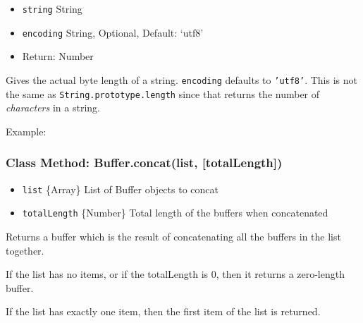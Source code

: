 \begin{itemize}
\itemsep1pt\parskip0pt
\item
  \texttt{string} String
\item
  \texttt{encoding} String, Optional, Default: `utf8'
\item
  Return: Number
\end{itemize}

Gives the actual byte length of a string. \texttt{encoding} defaults to
\texttt{'utf8'}. This is not the same as
\texttt{String.prototype.length} since that returns the number of
\emph{characters} in a string.

Example:

\begin{Shaded}
\begin{Highlighting}[]
\NormalTok{;}

 \NormalTok{+ } \NormalTok{+ } \NormalTok{+}
  \NormalTok{) + }\NormalTok{);}

\end{Highlighting}
\end{Shaded}

\subsubsection{Class Method: Buffer.concat(list,
{[}totalLength{]})}\label{class-method-buffer.concatlist-totallength}

\begin{itemize}
\itemsep1pt\parskip0pt
\item
  \texttt{list} \{Array\} List of Buffer objects to concat
\item
  \texttt{totalLength} \{Number\} Total length of the buffers when
  concatenated
\end{itemize}

Returns a buffer which is the result of concatenating all the buffers in
the list together.

If the list has no items, or if the totalLength is 0, then it returns a
zero-length buffer.

If the list has exactly one item, then the first item of the list is
returned.

